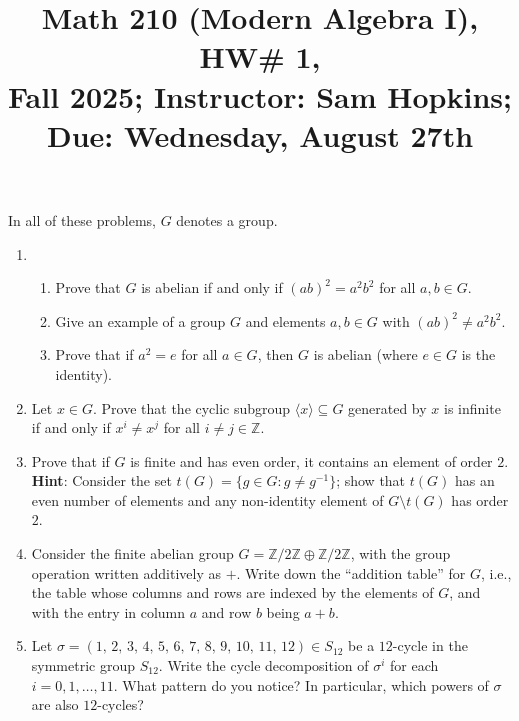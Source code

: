 \documentclass[11pt]{article}
\title{Math 210 (Modern Algebra I), HW\# 1, \\ {\normalsize Fall 2025; Instructor: Sam Hopkins; Due: Wednesday, August 27th}}
\date{}
\begin{document}
\maketitle

\thispagestyle{empty}

In all of these problems, $G$ denotes a group.

\begin{enumerate}

\item \begin{enumerate}
\item Prove that $G$ is abelian if and only if $(ab)^2=a^2b^2$ for all $a,b\in G$. 
\item Give an example of a group $G$ and elements $a,b\in G$ with $(ab)^2\neq a^2b^2$.
\item Prove that if $a^2 = e$ for all $a\in G$, then $G$ is abelian (where $e\in G$ is the identity).
\end{enumerate}

\item Let $x\in G$. Prove that the cyclic subgroup $\langle x \rangle \subseteq G$ generated by $x$ is infinite if and only if $x^{i} \neq x^{j}$ for all $i \neq j \in \mathbb{Z}$.

\item Prove that if $G$ is finite and has even order, it contains an element of order $2$. \\ {\bf Hint}: Consider the set $t(G) = \{g \in G\colon g \neq g^{-1}\}$; show that $t(G)$ has an even number of elements and any non-identity element of $G\setminus t(G)$ has order $2$.

\item Consider the finite abelian group $G = \mathbb{Z}/2\mathbb{Z} \oplus \mathbb{Z}/2\mathbb{Z}$, with the group operation written additively as $+$. Write down the ``addition table'' for $G$, i.e., the table whose columns and rows are indexed by the elements of $G$, and with the entry in column $a$ and row $b$ being $a+b$.

\item Let $\sigma = (1, \, 2, \, 3, \, 4, \, 5, \, 6, \, 7, \, 8, \, 9, \, 10, \, 11, \, 12) \in S_{12}$ be a $12$-cycle in the symmetric group $S_{12}$. Write the cycle decomposition of $\sigma^i$ for each $i=0,1,\ldots,11$. What pattern do you notice? In particular, which powers of $\sigma$ are also $12$-cycles?

\end{enumerate}
\end{document}
